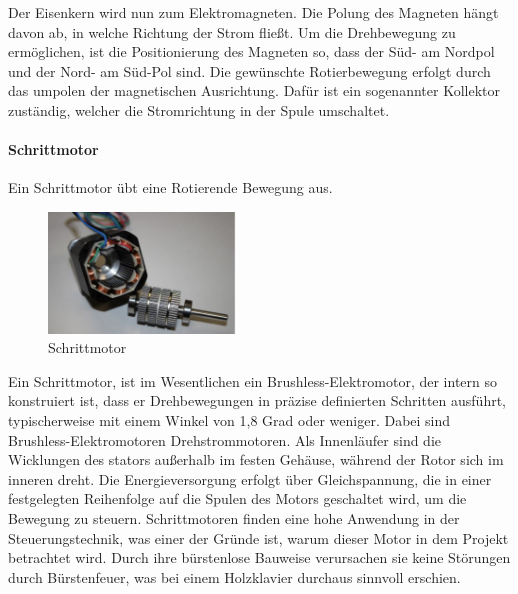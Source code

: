 Der Eisenkern wird nun zum Elektromagneten. Die Polung des Magneten hängt davon ab, in welche Richtung der Strom fließt.
Um die Drehbewegung zu ermöglichen, ist die Positionierung des Magneten so, dass der Süd- am Nordpol und der Nord- am Süd-Pol
sind. Die gewünschte Rotierbewegung erfolgt durch das umpolen der magnetischen Ausrichtung.
Dafür ist ein sogenannter Kollektor zuständig, welcher die Stromrichtung in der Spule umschaltet.


\paragraph{Schrittmotor\cite*[siehe ][]{Aufbau.Elektromotoren}}
Ein Schrittmotor übt eine Rotierende Bewegung aus.
\begin{figure}[htbp]
	\centering
	\includegraphics[width=5cm]{img/Schrittmotor}
	\caption{Schrittmotor\cite*[siehe ][]{Aufbau.Elektromotoren}}
	\label{fig:Linearmotor}
\end{figure}
Ein Schrittmotor, ist im Wesentlichen ein Brushless-Elektromotor, der intern so konstruiert ist,
dass er Drehbewegungen in präzise definierten Schritten ausführt, typischerweise mit einem Winkel von 1,8 Grad oder weniger.
Dabei sind Brushless-Elektromotoren Drehstrommotoren. Als Innenläufer sind die Wicklungen des stators außerhalb im festen Gehäuse,
während der Rotor sich im inneren dreht.
Die Energieversorgung erfolgt über Gleichspannung, die in einer festgelegten Reihenfolge auf die Spulen des Motors
geschaltet wird, um die Bewegung zu steuern.
Schrittmotoren finden eine hohe Anwendung in der Steuerungstechnik, was einer der Gründe ist, warum dieser Motor in dem
Projekt betrachtet wird. Durch ihre bürstenlose Bauweise verursachen sie keine Störungen durch Bürstenfeuer, was bei einem
Holzklavier durchaus sinnvoll erschien.



